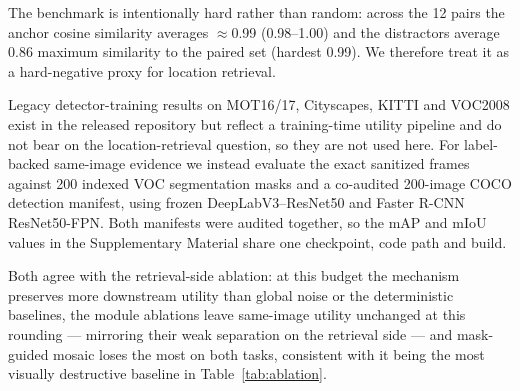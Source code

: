\documentclass[10pt,journal]{IEEEtran}
\begin{document}
The benchmark is intentionally hard rather than random: across the 12 pairs the anchor cosine similarity averages $\approx$0.99 (0.98--1.00) and the distractors average 0.86 maximum similarity to the paired set (hardest 0.99). We therefore treat it as a hard-negative proxy for location retrieval.

Legacy detector-training results on MOT16/17, Cityscapes, KITTI and VOC2008
exist in the released repository but reflect a training-time utility pipeline
and do not bear on the location-retrieval question, so they are not used here.
For label-backed same-image evidence we instead evaluate the exact sanitized
frames against 200 indexed VOC segmentation masks and a co-audited 200-image
COCO detection manifest, using frozen DeepLabV3--ResNet50 and Faster R-CNN
ResNet50-FPN. Both manifests were audited together, so the mAP and mIoU values
in the Supplementary Material share one checkpoint, code path and build.

Both agree with the retrieval-side ablation: at this budget the mechanism
preserves more downstream utility than global noise or the deterministic
baselines, the module ablations leave same-image utility unchanged at this
rounding --- mirroring their weak separation on the retrieval side --- and
mask-guided mosaic loses the most on both tasks, consistent with it being the
most visually destructive baseline in Table~\ref{tab:ablation}.
\end{document}
